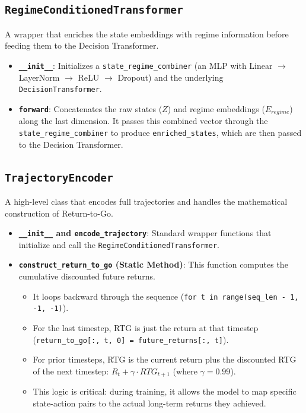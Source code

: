 \documentclass[12pt,a4paper]{report}
\begin{document}
\subsection{\texttt{RegimeConditionedTransformer}}
A wrapper that enriches the state embeddings with regime information before feeding them to the Decision Transformer.
\begin{itemize}
    \item \textbf{\texttt{\_\_init\_\_}}: Initializes a \texttt{state\_regime\_combiner} (an MLP with Linear $\rightarrow$ LayerNorm $\rightarrow$ ReLU $\rightarrow$ Dropout) and the underlying \texttt{DecisionTransformer}.
    \item \textbf{\texttt{forward}}: Concatenates the raw states ($Z$) and regime embeddings ($E_{regime}$) along the last dimension. It passes this combined vector through the \texttt{state\_regime\_combiner} to produce \texttt{enriched\_states}, which are then passed to the Decision Transformer.
\end{itemize}

\subsection{\texttt{TrajectoryEncoder}}
A high-level class that encodes full trajectories and handles the mathematical construction of Return-to-Go.
\begin{itemize}
    \item \textbf{\texttt{\_\_init\_\_} and \texttt{encode\_trajectory}}: Standard wrapper functions that initialize and call the \texttt{RegimeConditionedTransformer}.
    \item \textbf{\texttt{construct\_return\_to\_go} (Static Method)}: This function computes the cumulative discounted future returns.
    \begin{itemize}
        \item It loops backward through the sequence (\texttt{for t in range(seq\_len - 1, -1, -1)}).
        \item For the last timestep, RTG is just the return at that timestep (\texttt{return\_to\_go[:, t, 0] = future\_returns[:, t]}).
        \item For prior timesteps, RTG is the current return plus the discounted RTG of the next timestep: $R_t + \gamma \cdot RTG_{t+1}$ (where $\gamma = 0.99$).
        \item This logic is critical: during training, it allows the model to map specific state-action pairs to the actual long-term returns they achieved.
    \end{itemize}
\end{itemize}
\end{document}
